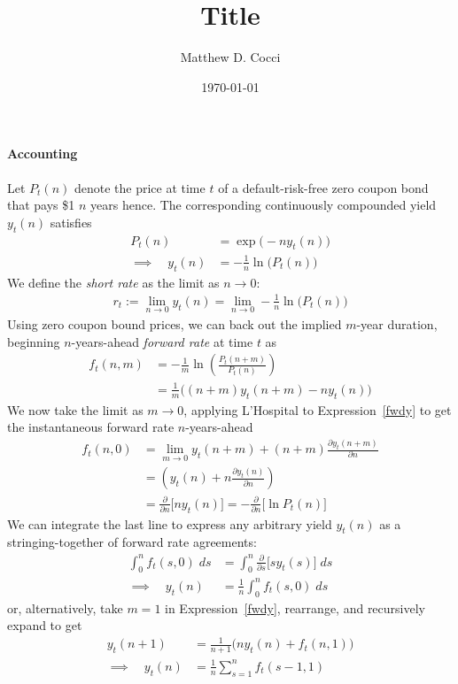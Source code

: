 \documentclass[12pt]{article}
\author{Matthew D. Cocci}
\title{Title}
\date{\today}
\theoremstyle{plain}
\theoremstyle{definition}
\theoremstyle{remark}
\newcommand{\ra}{\rightarrow}
\begin{document}

\begin{multicols*}{2}
\paragraph{Accounting}
Let $P_t(n)$ denote the price at time $t$ of a default-risk-free zero
coupon bond that pays \$1 $n$ years hence. The corresponding
continuously compounded yield $y_t(n)$ satisfies
\begin{align}
  P_t(n) &= \exp\big(-n y_t(n) \big)
  \label{P}
  \\
  \implies\quad
  y_t(n) &= -\frac{1}{n}\ln\big( P_t(n)\big)
  \label{y}
\end{align}
We define the \emph{short rate} as the limit as $n\ra 0$:
\begin{align*}
  r_t := \lim_{n\ra 0} y_t(n)
  = \lim_{n\ra 0}
  -\frac{1}{n}\ln\big(P_t(n)\big)
\end{align*}
Using zero coupon bound prices, we can back out the implied $m$-year
duration, beginning $n$-years-ahead \emph{forward rate} at time $t$ as
\begin{align}
  f_t(n,m) &=
  -\frac{1}{m}
  \ln
  \left(
  \frac{P_t(n+m)}{P_t(n)}
  \right)
  \label{fwdP}
  \\
  &=
  \frac{1}{m}
  \big(
  (n+m)y_t(n+m)
  -ny_t(n)
  \big)
  \label{fwdy}
\end{align}
We now take the limit as $m\ra 0$, applying L'Hospital to
Expression~\ref{fwdy} to get the instantaneous forward rate
$n$-years-ahead
\begin{align*}
  f_t(n,0)
  &=
  \lim_{m\ra 0}
  y_t(n+m)
  +
  (n+m)\frac{\partial y_t(n+m)}{\partial n}
  \\
  &=
  \left(
  y_t(n)
  +
  n\frac{\partial y_t(n)}{\partial n}
  \right)
  \\
  &=
  \frac{\partial }{\partial n}
  \big[
  ny_t(n)
  \big]
  =
  -\frac{\partial }{\partial n}
  \big[
  \ln P_t(n)
  \big]
\end{align*}
We can integrate the last line to express any arbitrary yield $y_t(n)$
as a stringing-together of forward rate agreements:
\begin{align*}
  \int_0^n f_t(s,0) \; ds
  &=
  \int_0^n
  \frac{\partial }{\partial s}
  \big[
  sy_t(s)
  \big]
  \; ds
  \\
  \implies\quad
  y_t(n)
  &=
  \frac{1}{n}
  \int_0^n f_t(s,0) \; ds
\end{align*}
or, alternatively, take $m=1$ in Expression~\ref{fwdy}, rearrange, and
recursively expand to get
\begin{align*}
  y_t(n+1)
  &=
  \frac{1}{n+1}
  \big(
  ny_t(n)
  + f_t(n,1)
  \big)
  \\
  \implies\quad
  y_t(n)
  &=
  \frac{1}{n}
  \sum_{s=1}^{n}
  f_t(s-1,1)
\end{align*}
\columnbreak


\end{multicols*}
\end{document}

